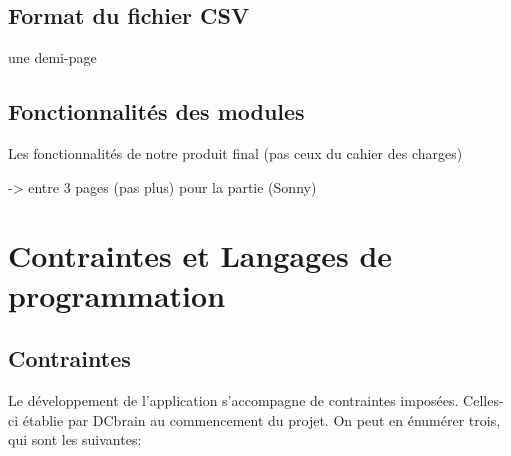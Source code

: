 		\subsection{Format du fichier CSV}
			une demi-page
		\subsection{Fonctionnalités des modules}
			Les fonctionnalités de notre produit final (pas ceux du cahier des charges)
		
		-> entre 3 pages (pas plus) pour la partie (Sonny)
		
	\section{Contraintes et Langages de programmation}
		\subsection{Contraintes}
		Le développement de l'application s'accompagne de contraintes imposées. Celles-ci établie par DCbrain au commencement du projet. On peut en énumérer trois, qui sont les suivantes:\\
